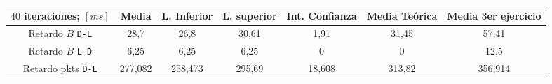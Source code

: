 \documentclass{article}[10pt]
\begin{document}
		\begin{tabular}{| c | c | c | c | c | c | c |}
					\hline
					$40$ iteraciones; $[ms]$ & Media & L. Inferior & L. superior & Int. Confianza & Media Teórica & Media 3er ejercicio\\
					\hline
					Retardo $B$ \texttt{D-L} & 28,7 & 26,8 & 30,61 & 1,91 & 31,45 & 57,41\\
					\hline
					Retardo $B$ \texttt{L-D} & 6,25 & 6,25 & 6,25 & 0 & 0 & 12,5\\
					\hline
					Retardo pkts \texttt{D-L} & 277,082 & 258,473 & 295,69 & 18,608 & 313,82 & 356,914\\
					\hline
		\end{tabular}
\end{document}
